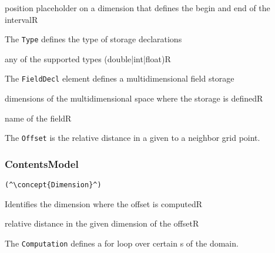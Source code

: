 \begin{HIRChildElements}
	{position placeholder on a dimension that defines the begin and end of the interval}{R}
\end{HIRChildElements}


The {\tt Type} defines the type of storage declarations
\HIRContentsModel{ () }

\begin{HIRAttributes}
	{any of the supported types (double|int|float)}{R}
\end{HIRAttributes}

The {\tt FieldDecl} element defines a multidimensional field storage

\begin{HIRChildElements}
	{dimensions of the multidimensional space where the storage is defined}{R}
\end{HIRChildElements}

\begin{HIRAttributes}
	{name of the field}{R}
\end{HIRAttributes}


The {\tt Offset} is the relative distance in a given  to a neighbor grid point.

\subsubsection*{ContentsModel}{}

\begin{lstlisting}[style=default]
(^\concept{Dimension}^)
\end{lstlisting}

\begin{HIRChildElements}
	{Identifies the dimension where the offset is computed}{R}
\end{HIRChildElements}

\begin{HIRAttributes}
	{relative distance in the given dimension of the offset}{R}
\end{HIRAttributes}

The {\tt Computation} defines a for loop over certain s of the domain. 

